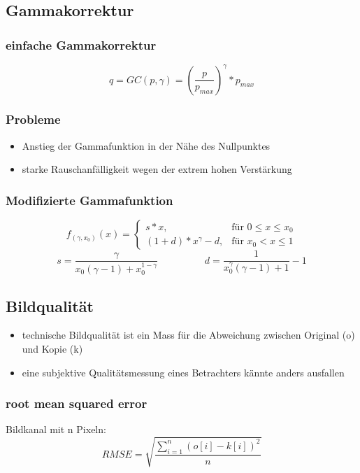 \documentclass[10pt]{article}
\begin{document}
\subsection{Gammakorrektur}
\subsubsection*{einfache Gammakorrektur}
\begin{equation*}
	q = GC(p, \gamma) = \left( \frac{p}{p_{max}}\right)^\gamma * p_{max}
\end{equation*}
\subsubsection*{Probleme}
\begin{itemize}
	\item Anstieg der Gammafunktion in der Nähe des Nullpunktes
	\item starke Rauschanfälligkeit wegen der extrem hohen Verstärkung
\end{itemize}
\subsubsection*{Modifizierte Gammafunktion}
\begin{equation*}
	f_{(\gamma, x_0)}(x) = \begin{cases}
		s * x, & \text{für } 0 \leq x \leq x_0 \\
		(1+d) * x^\gamma - d, & \text{für } x_0 < x \leq 1
	\end{cases}
\end{equation*}
\begin{equation*}
	s = \frac{\gamma}{x_0(\gamma-1)+x_0^{1-\gamma}} \hspace{2cm} d = \frac{1}{x_0^\gamma(\gamma-1)+1}-1
\end{equation*}

\subsection{Bildqualität}
\begin{itemize}
	\item technische Bildqualität ist ein Mass für die Abweichung zwischen Original (o) und Kopie (k)
	\item eine subjektive Qualitätsmessung eines Betrachters kännte anders ausfallen
\end{itemize}
\subsubsection*{root mean squared error}
Bildkanal mit n Pixeln:
\begin{equation*}
	RMSE = \sqrt{\frac{\sum_{i=1}^n (o[i]-k[i])^2}{n}}
\end{equation*}
\end{document}
